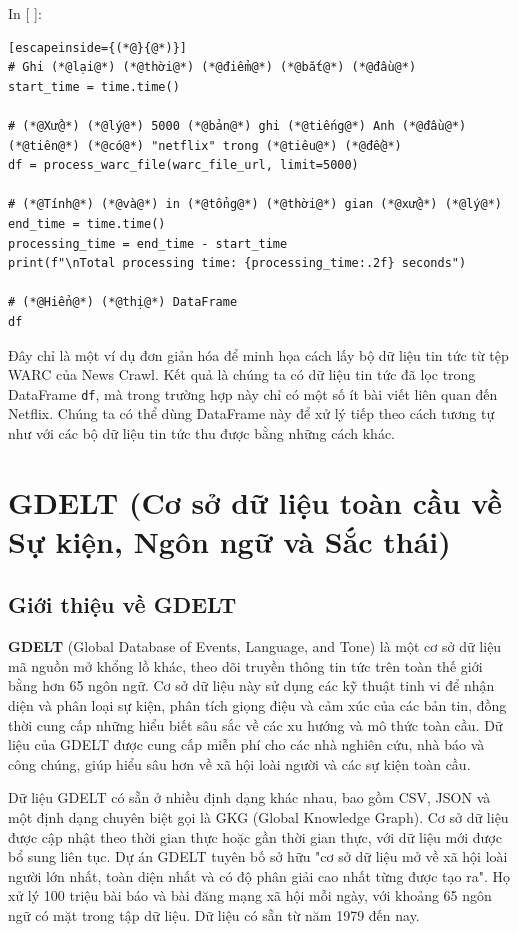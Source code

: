 In {[} {]}:

\begin{lstlisting}[escapeinside={(*@}{@*)}]
# Ghi (*@lại@*) (*@thời@*) (*@điểm@*) (*@bắt@*) (*@đầu@*)
start_time = time.time()

# (*@Xử@*) (*@lý@*) 5000 (*@bản@*) ghi (*@tiếng@*) Anh (*@đầu@*) (*@tiên@*) (*@có@*) "netflix" trong (*@tiêu@*) (*@đề@*)
df = process_warc_file(warc_file_url, limit=5000)

# (*@Tính@*) (*@và@*) in (*@tổng@*) (*@thời@*) gian (*@xử@*) (*@lý@*)
end_time = time.time()
processing_time = end_time - start_time
print(f"\nTotal processing time: {processing_time:.2f} seconds")

# (*@Hiển@*) (*@thị@*) DataFrame
df
\end{lstlisting}

Đây chỉ là một ví dụ đơn giản hóa để minh họa cách lấy bộ dữ liệu tin tức từ tệp WARC của News Crawl. Kết quả là chúng ta có dữ liệu tin tức đã lọc trong DataFrame \texttt{df}, mà trong trường hợp này chỉ có một số ít bài viết liên quan đến Netflix. Chúng ta có thể dùng DataFrame này để xử lý tiếp theo cách tương tự như với các bộ dữ liệu tin tức thu được bằng những cách khác.

\section{GDELT (Cơ sở dữ liệu toàn cầu về Sự kiện, Ngôn ngữ và Sắc thái)}

\subsection{Giới thiệu về GDELT}

\textbf{GDELT} (Global Database of Events, Language, and Tone) là một cơ sở dữ liệu mã nguồn mở khổng lồ khác, theo dõi truyền thông tin tức trên toàn thế giới bằng hơn 65 ngôn ngữ. Cơ sở dữ liệu này sử dụng các kỹ thuật tinh vi để nhận diện và phân loại sự kiện, phân tích giọng điệu và cảm xúc của các bản tin, đồng thời cung cấp những hiểu biết sâu sắc về các xu hướng và mô thức toàn cầu. Dữ liệu của GDELT được cung cấp miễn phí cho các nhà nghiên cứu, nhà báo và công chúng, giúp hiểu sâu hơn về xã hội loài người và các sự kiện toàn cầu.

Dữ liệu GDELT có sẵn ở nhiều định dạng khác nhau, bao gồm CSV, JSON và một định dạng chuyên biệt gọi là GKG (Global Knowledge Graph). Cơ sở dữ liệu được cập nhật theo thời gian thực hoặc gần thời gian thực, với dữ liệu mới được bổ sung liên tục. Dự án GDELT tuyên bố sở hữu "cơ sở dữ liệu mở về xã hội loài người lớn nhất, toàn diện nhất và có độ phân giải cao nhất từng được tạo ra". Họ xử lý 100 triệu bài báo và bài đăng mạng xã hội mỗi ngày, với khoảng 65 ngôn ngữ có mặt trong tập dữ liệu. Dữ liệu có sẵn từ năm 1979 đến nay.


